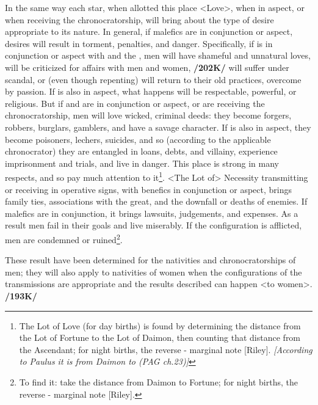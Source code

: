 In the same way each star, when allotted this place <Love>, when in aspect, or when receiving the chronocratorship, will bring about the type of desire appropriate to its nature. In general, if malefics are in conjunction or aspect, desires will result in torment, penalties, and danger. Specifically, if \Saturn\xspace is in conjunction or aspect with \Venus\xspace and the \Moon, men will have shameful and unnatural loves, will be criticized for affairs with men and women, \textbf{/202K/} will suffer under scandal, or (even though repenting) will return to their old practices, overcome by passion. If \Jupiter\xspace is also in aspect, what happens will be respectable, powerful, or religious. But if \Mars\xspace and \Mercury\xspace are in conjunction or aspect, or are receiving the chronocratorship, men will love wicked, criminal deeds: they become forgers, robbers, burglars, gamblers, and have a savage character. If \Venus\xspace is also in aspect, they become poisoners, lechers, suicides, and so (according to the applicable chronocrator) they are entangled in loans, debts, and villainy, experience imprisonment and trials, and live in danger. This place is strong in many respects, and so pay much
attention to it\footnote{The Lot of Love (for day births) is found by determining the distance from the Lot of Fortune to the Lot of Daimon, then counting that distance from the Ascendant; for night births, the reverse - marginal note [Riley]. \textsl{[According to Paulus it is from Daimon to \Venus (PAG ch.23)]}}.
\enlargethispage{\baselineskip}
<The Lot of> Necessity  transmitting or receiving in operative signs, with benefics in conjunction or
aspect, brings family ties, associations with the great, and the downfall or deaths of enemies. If malefics are in conjunction, it brings lawsuits, judgements, and expenses. As a result men fail in their goals and live miserably. If the configuration is afflicted, men are condemned or ruined\footnote{To find it: take the distance from Daimon to Fortune; for night births, the reverse - marginal note [Riley].}.

These result have been determined for the nativities and chronocratorships of men; they will also apply to nativities of women when the configurations of the transmissions are appropriate and the results described can happen <to women>. \textbf{/193K/}

\newpage